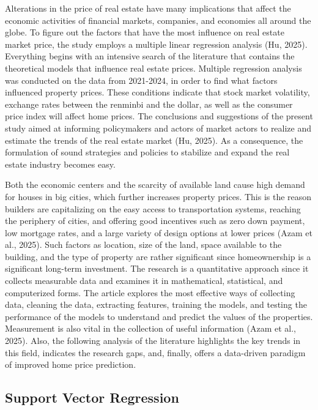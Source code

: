 \documentclass[12pt, a4paper, oneside]{book}
\begin{document}
Alterations in the price of real estate have many implications that affect the economic activities of financial markets, companies, and economies all around the globe. To figure out the factors that have the most influence on real estate market price, the study employs a multiple linear regression analysis (Hu, 2025). Everything begins with an intensive search of the literature that contains the theoretical models that influence real estate prices. Multiple regression analysis was conducted on the data from 2021-2024, in order to find what factors influenced property prices. These conditions indicate that stock market volatility, exchange rates between the renminbi and the dollar, as well as the consumer price index will affect home prices. The conclusions and suggestions of the present study aimed at informing policymakers and actors of market actors to realize and estimate the trends of the real estate market (Hu, 2025). As a consequence, the formulation of sound strategies and policies to stabilize and expand the real estate industry becomes easy.


Both the economic centers and the scarcity of available land cause high demand for houses in big cities, which further increases property prices. This is the reason builders are capitalizing on the easy access to transportation systems, reaching the periphery of cities, and offering good incentives such as zero down payment, low mortgage rates, and a large variety of design options at lower prices (Azam et al., 2025). Such factors as location, size of the land, space available to the building, and the type of property are rather significant since homeownership is a significant long-term investment. The research is a quantitative approach since it collects measurable data and examines it in mathematical, statistical, and computerized forms. The article explores the most effective ways of collecting data, cleaning the data, extracting features, training the models, and testing the performance of the models to understand and predict the values of the properties. Measurement is also vital in the collection of useful information (Azam et al., 2025). Also, the following analysis of the literature highlights the key trends in this field, indicates the research gaps, and, finally, offers a data-driven paradigm of improved home price prediction.



\subsection{Support Vector Regression}
\end{document}
